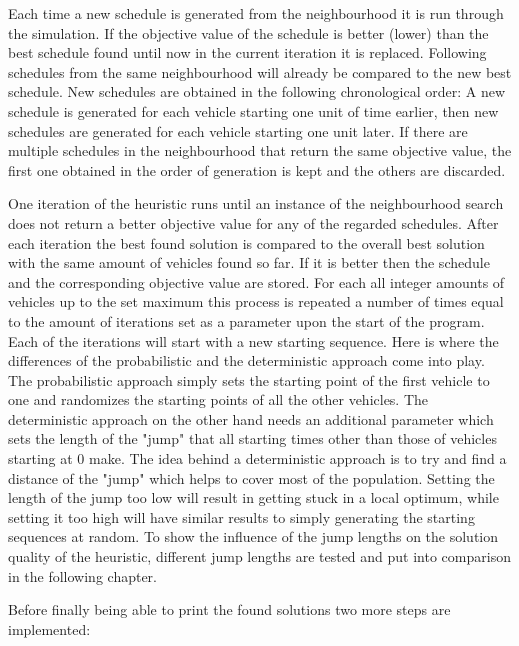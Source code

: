 Each time a new schedule is generated from the neighbourhood it is run through the simulation. If the objective value of the schedule is better
(lower) than the best schedule found until now in the current iteration it is replaced. Following schedules from the same neighbourhood will already
be compared to the new best schedule. New schedules are obtained in the following chronological order: A new schedule is generated for each vehicle
starting one unit of time earlier, then new schedules are generated for each vehicle starting one unit later. If there are multiple schedules in
the neighbourhood that return the same objective value, the first one obtained in the order of generation is kept and the others are discarded.

One iteration of the heuristic runs until an instance of the neighbourhood search does not return a better objective value for any of the regarded
schedules. After each iteration the best found solution is compared to the overall best solution with the same amount of vehicles found so far.
If it is better then the schedule and the corresponding objective value are stored. For each all integer amounts of vehicles up to the set maximum
this process is repeated a number of times equal to the amount of iterations set as a parameter upon the start of the program. Each of the iterations
will start with a new starting sequence. Here is where the differences of the probabilistic and the deterministic approach come into play. The probabilistic
approach simply sets the starting point of the first vehicle to one and randomizes the starting points of all the other vehicles. The deterministic
approach on the other hand needs an additional parameter which sets the length of the "jump" that all starting times other than those of vehicles
starting at 0 make. The idea behind a deterministic approach is to try and find a distance of the "jump" which helps to cover most of the population.
Setting the length of the jump too low will result in getting stuck in a local optimum, while setting it too high will have similar results to simply
generating the starting sequences at random. To show the influence of the jump lengths on the solution quality of the heuristic, different jump lengths
are tested and put into comparison in the following chapter.

Before finally being able to print the found solutions two more steps are implemented: 

